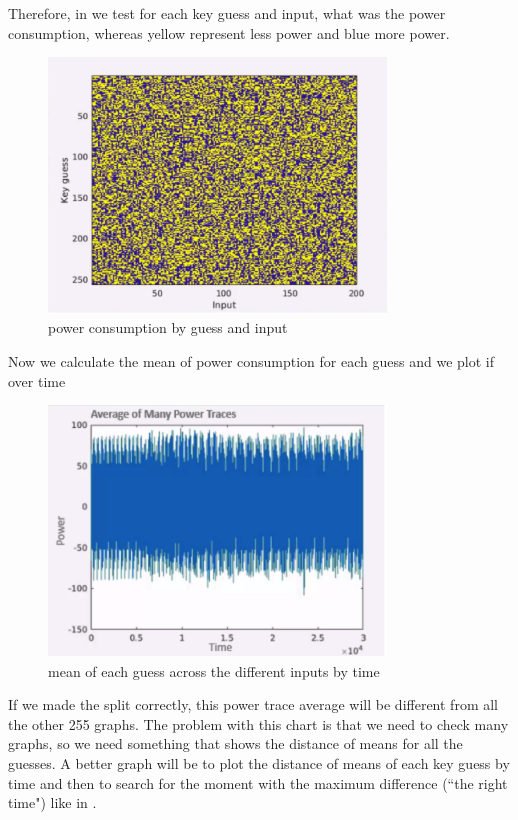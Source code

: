 Therefore, in  we test for each key guess and
input, what was the power consumption, whereas yellow represent less power and
blue more power.

\begin{figure}[!ht]
    \centering
    \includegraphics[width=0.8\textwidth]{images/Lecture6/intensity_by_guess.png}
    \caption{power consumption by guess and input} \label{fig:intensity_by_guess}
\end{figure}

Now we calculate the mean of power consumption for each guess and we plot if
over time

\begin{figure}[!ht]
    \centering
    \includegraphics[width=0.8\textwidth]{images/Lecture6/avg_of_many_traces.png}
    \caption{mean of each guess across the different inputs by time} \label{fig:avg_of_many_traces}
\end{figure}

If we made the split correctly, this power trace average will be different from
all the other 255 graphs. The problem with this chart is that we need to check
many graphs, so we need something that shows the distance of means for all the
guesses. A better graph will be to plot the distance of means of each key guess
by time and then to search for the moment with the maximum difference (``the
right time") like in .

